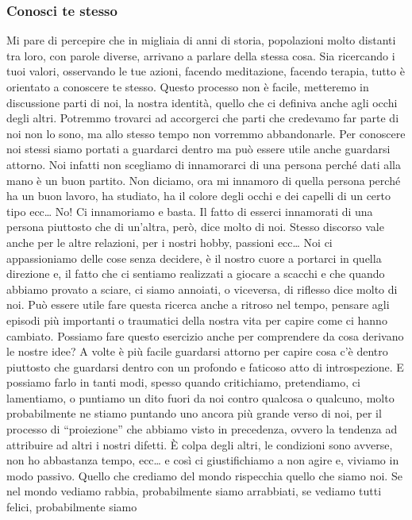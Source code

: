 \documentclass[12pt]{book} %
\begin{document}
\subsubsection{Conosci te stesso}
Mi pare di percepire che in migliaia di anni di storia, popolazioni molto distanti tra loro, con parole diverse,
arrivano a parlare della stessa cosa. Sia ricercando i tuoi valori, osservando le tue azioni, facendo meditazione,
facendo terapia, tutto è orientato a conoscere te stesso. Questo processo non è facile, metteremo in discussione parti
di noi, la nostra identità, quello che ci definiva anche agli occhi degli altri. Potremmo trovarci ad accorgerci che
parti che credevamo far parte di noi non lo sono, ma allo stesso tempo non vorremmo abbandonarle. Per conoscere noi
stessi siamo portati a guardarci dentro ma può essere utile anche guardarsi attorno. Noi infatti non scegliamo di
innamorarci di una persona perché dati alla mano è un buon partito. Non diciamo, ora mi innamoro di quella persona
perché ha un buon lavoro, ha studiato, ha il colore degli occhi e dei capelli di un certo tipo ecc… No! Ci innamoriamo
e basta. Il fatto di esserci innamorati di una persona piuttosto che di un'altra, però, dice molto
di noi. Stesso discorso vale anche per le altre relazioni, per i nostri hobby, passioni ecc… Noi ci appassioniamo delle
cose senza decidere, è il nostro cuore a portarci in quella direzione e, il fatto che ci sentiamo realizzati a giocare
a scacchi e che quando abbiamo provato a sciare, ci siamo annoiati, o viceversa, di riflesso dice molto di noi. Può
essere utile fare questa ricerca anche a ritroso nel tempo, pensare agli episodi più importanti o traumatici della
nostra vita per capire come ci hanno cambiato. Possiamo fare questo esercizio anche per comprendere da cosa derivano le
nostre idee? A volte è più facile guardarsi attorno per capire cosa c'è dentro piuttosto che guardarsi dentro con un
profondo e faticoso atto di introspezione. E possiamo farlo in tanti modi, spesso quando critichiamo, pretendiamo, ci
lamentiamo, o puntiamo un dito fuori da noi contro qualcosa o qualcuno, molto probabilmente ne stiamo puntando uno
ancora più grande verso di noi, per il processo di “proiezione” che abbiamo visto in precedenza, ovvero la tendenza ad
attribuire ad altri i nostri difetti. È colpa degli altri, le condizioni sono avverse, non ho abbastanza tempo, ecc… e
così ci giustifichiamo a non agire e, viviamo in modo passivo. Quello che crediamo del mondo rispecchia quello che
siamo noi. Se nel mondo vediamo rabbia, probabilmente siamo arrabbiati, se vediamo tutti felici, probabilmente siamo
\end{document}
